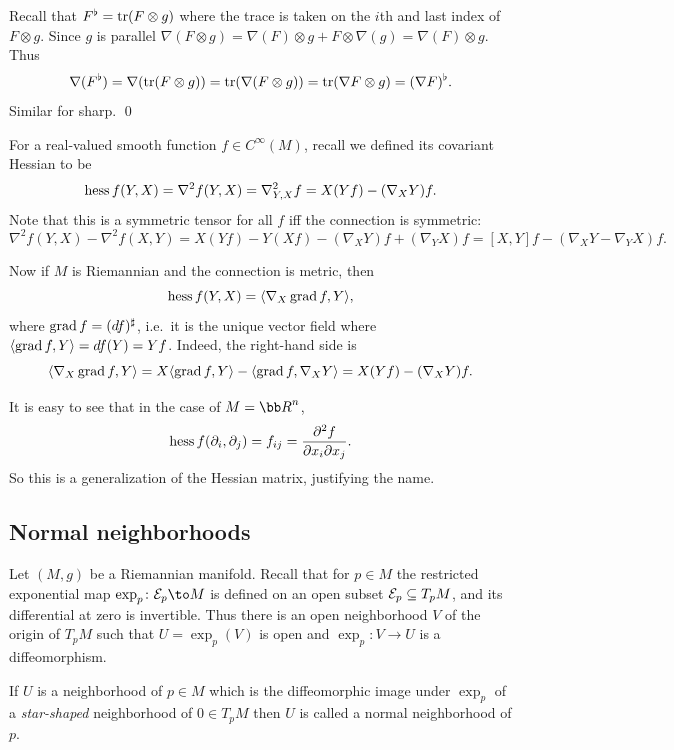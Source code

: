 \eprop

\bproof

    Recall that $F^\flat={\rm tr}(F\otimes g)$ where the trace is taken on the $i$th and last index of $F\otimes g$.
    Since $g$ is parallel $\nabla(F\otimes g)=\nabla(F)\otimes g+F\otimes\nabla(g)=\nabla(F)\otimes g$.
    Thus
    $$ \nabla(F^\flat) = \nabla({\rm tr}(F\otimes g)) = {\rm tr}(\nabla(F\otimes g)) = {\rm tr}(\nabla F\otimes g) = (\nabla F)^\flat . $$
    Similar for sharp.
    \qed

\eproof

\bnote

    For a real-valued smooth function $f\in C^\infty(M)$, recall we defined its covariant Hessian to be
    $$ \mathop{\rm hess}\nolimits f(Y,X) = \nabla^2f(Y,X) = \nabla^2_{Y,X}f = X(Yf) - (\nabla_XY)f . $$
    Note that this is a symmetric tensor for all $f$ iff the connection is symmetric:
    $$ \nabla^2f(Y,X) - \nabla^2f(X,Y) = X(Yf) - Y(Xf) - (\nabla_XY)f + (\nabla_YX)f = [X,Y]f - (\nabla_XY-\nabla_YX)f . $$

    Now if $M$ is Riemannian and the connection is metric, then
    $$ \mathop{\rm hess}\nolimits f(Y,X) = \mathopen{}\mathclose{\left<\nabla_X\mathop{\rm grad}\nolimits f,Y\right>} , $$
    where $\mathop{\rm grad}\nolimits f=(df)^\sharp$, i.e.\ it is the unique vector field where $\mathopen{}\mathclose{\left<\mathop{\rm grad}\nolimits f,Y\right>}=df(Y)=Yf$.
    Indeed, the right-hand side is
    $$ \mathopen{}\mathclose{\left<\nabla_X\mathop{\rm grad}\nolimits f,Y\right>} = X\mathopen{}\mathclose{\left<\mathop{\rm grad}\nolimits f,Y\right>} - \mathopen{}\mathclose{\left<\mathop{\rm grad}\nolimits f,\nabla_XY\right>} = X(Yf) - (\nabla_XY)f . $$

    It is easy to see that in the case of $M=\bR^n$,
    $$ \mathop{\rm hess}\nolimits f(\partial_i,\partial_j) = f_{ij} = {{\partial ^2f}\over{\partial x_i\partial x_j}} . $$
    So this is a generalization of the Hessian matrix, justifying the name.

\enote

\subsection{Normal neighborhoods}

Let $(M,g)$ be a Riemannian manifold.
Recall that for $p\in M$ the restricted exponential map $\exp_p\colon\E_p\to M$ is defined on an open subset
${{\cal E}}_p\subseteq T_pM$, and its differential at zero is invertible.
Thus there is an open neighborhood $V$ of the origin of $T_pM$ such that $U=\exp_p(V)$ is open and $\exp_p\colon V\to U$
is a diffeomorphism.

\bdefn

    If $U$ is a neighborhood of $p\in M$ which is the diffeomorphic image under $\exp_p$ of a {\it star-shaped\/} neighborhood
    of $0\in T_pM$ then $U$ is called a {\emphcolor normal neighborhood} of $p$.

